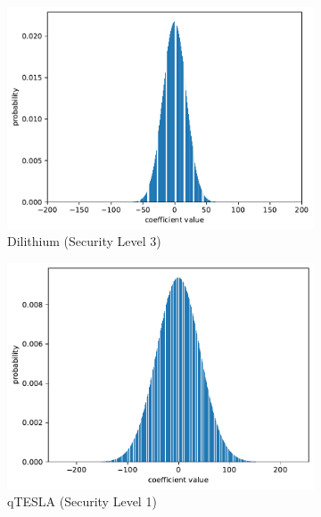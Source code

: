 \begin{figure}%
	\centering%
	\begin{subfigure}{.5\textwidth}%
		\centering%
		\includegraphics[width=.95\linewidth]{plots/dilithium_l3_cs_plot}%
		\caption{Dilithium (Security Level 3)}%
	\end{subfigure}%
	\begin{subfigure}{.5\textwidth}%
		\centering%
		\includegraphics[width=.95\linewidth]{plots/qtesla_l3_cs_plot}%
		\caption{qTESLA (Security Level 1)}%
	\end{subfigure}\\\vspace{1em}%
	\begin{subfigure}{.5\textwidth}%
		\centering%

\end{subfigure}
\end{figure}
